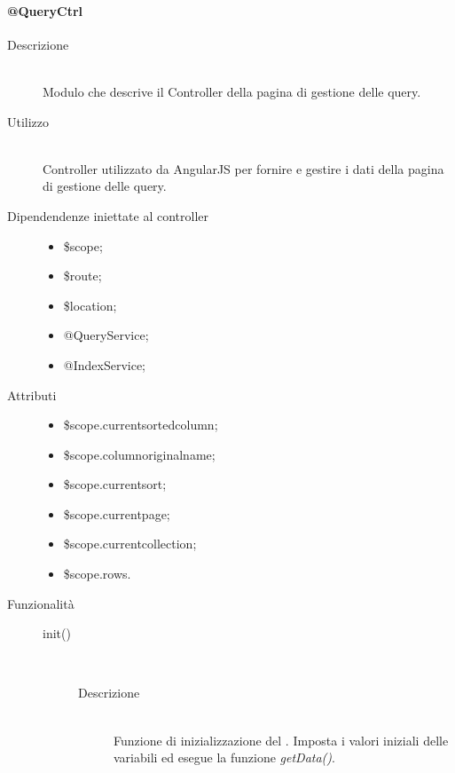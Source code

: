 \paragraph{@QueryCtrl}
\begin{description}
 \item[Descrizione] \hfill \\
 Modulo che descrive il Controller della pagina di gestione delle query.
 
 \item[Utilizzo] \hfill \\
 Controller utilizzato da AngularJS per fornire e gestire i dati della pagina di gestione delle query.
 
 
 \item[Dipendendenze iniettate al controller] \hfill
 \begin{itemize}
  \item \$scope;
  \item \$route;
  \item \$location;
  \item @QueryService;
  \item @IndexService;
 \end{itemize}
 
 \item[Attributi] \hfill
 \begin{itemize}
 \item \$scope.current\textunderscore sorted\textunderscore column;
 \item \$scope.column\textunderscore original\textunderscore name;
 \item \$scope.current\textunderscore sort;
 \item \$scope.current\textunderscore page;
 \item \$scope.current\textunderscore collection;
 \item \$scope.rows.
 \end{itemize}
 
 \item[Funzionalità] \hfill
 \begin{description}
  \item[init()] \hfill \\
  \begin{description}
  	\item[Descrizione] \hfill \\
  Funzione di inizializzazione del . Imposta i valori iniziali delle variabili ed esegue la funzione \textit{getData()}.
  \end{description}
  

\end{description}
\end{description}
